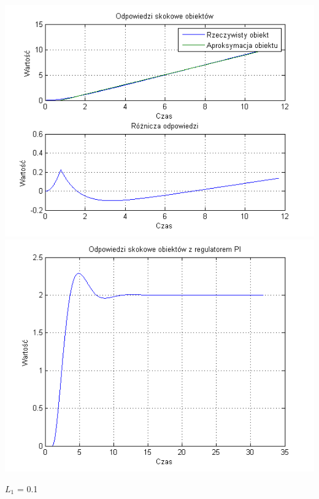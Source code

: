 \documentclass[10pt,a4paper]{article}
\begin{document}
\begin{center}
\includegraphics[scale=1]{images/jeden/skrypt_139.png}\\
\includegraphics[scale=1]{images/jeden/skrypt_140.png}\\
\end{center}
\newpage
$L_1$ = 0.1
\end{document}
